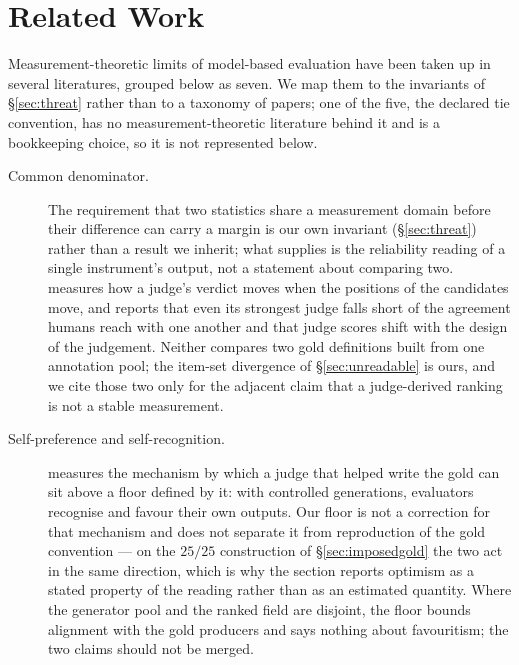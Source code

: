 \documentclass{article}
\begin{document}
\section{Related Work}
\label{sec:related}
Measurement-theoretic limits of model-based evaluation have been taken up in several literatures, grouped below as seven. We map them to the invariants of \S\ref{sec:threat} rather than to a taxonomy of papers; one of the five, the declared tie convention, has no measurement-theoretic literature behind it and is a bookkeeping choice, so it is not represented below.

\begin{description}
\item[Common denominator.] The requirement that two statistics share a measurement domain before their difference can carry a margin is our own invariant (\S\ref{sec:threat}) rather than a result we inherit; what \cite{cronbach1951} supplies is the reliability reading of a single instrument's output, not a statement about comparing two. \cite{shi2025positionbias} measures how a judge's verdict moves when the positions of the candidates move, and \cite{thakur2024judgingjudges} reports that even its strongest judge falls short of the agreement humans reach with one another and that judge scores shift with the design of the judgement. Neither compares two gold definitions built from one annotation pool; the item-set divergence of \S\ref{sec:unreadable} is ours, and we cite those two only for the adjacent claim that a judge-derived ranking is not a stable measurement.
\item[Self-preference and self-recognition.] \cite{panickssery2024selfpreference} measures the mechanism by which a judge that helped write the gold can sit above a floor defined by it: with controlled generations, evaluators recognise and favour their own outputs. Our floor is not a correction for that mechanism and does not separate it from reproduction of the gold convention --- on the $25/25$ construction of \S\ref{sec:imposedgold} the two act in the same direction, which is why the section reports optimism as a stated property of the reading rather than as an estimated quantity. Where the generator pool and the ranked field are disjoint, the floor bounds alignment with the gold producers and says nothing about favouritism; the two claims should not be merged.


\end{description}
\end{document}
